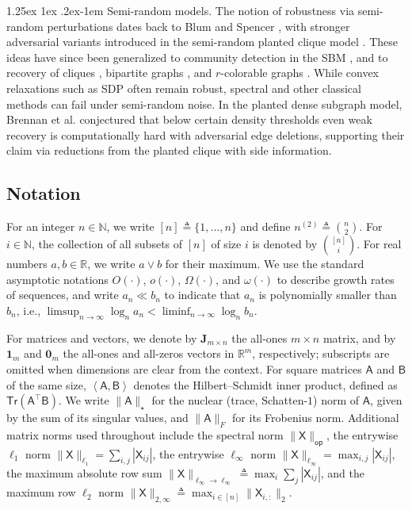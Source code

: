 \documentclass[12pt]{article}
\makeatletter
\newcommand{\R}{\mathbb{R}}
\newcommand{\N}{\mathbb{N}}
\newcommand{\innerP}[1]{\left\langle#1\right\rangle}
\newcommand{\s}[1]{\mathsf{#1}}
\renewcommand{\paragraph}{%
  \@startsection{paragraph}{4}%
  {\z@}{1.25ex \@plus 1ex \@minus .2ex}{-1em}%
  {\normalfont\normalsize\bfseries}%
}
\makeatother
\begin{document}
\paragraph{Semi-random models.} The notion of robustness via semi-random perturbations dates back to Blum and Spencer \cite{blum1995coloring}, with stronger adversarial variants introduced in the semi-random planted clique model \cite{feige2000finding,feige2001heuristics}. These ideas have since been generalized to community detection in the SBM \cite{charikar2017learning,moitra2016robustCD,banks2021local,bhaskara2024robustness}, and to recovery of cliques \cite{steinhardt2017does,mckenzie2020new,buhai2023algorithms,blasiok2024semirandom,guruswami2025semirandom}, bipartite graphs \cite{Kumar22}, and $r$-colorable graphs \cite{louis2025robust}. While convex relaxations such as SDP often remain robust, spectral and other classical methods can fail under semi-random noise. In the planted dense subgraph model, Brennan et al. \cite{brennan20a} conjectured that below certain density thresholds even weak recovery is computationally hard with adversarial edge deletions, supporting their claim via reductions from the planted clique with side information.

\subsection{Notation}

For an integer $n\in\N$, we write $[n]\triangleq\{1,\dots,n\}$ and define $n^{(2)}\triangleq\binom{n}{2}$. For $i\in\N$, the collection of all subsets of $[n]$ of size $i$ is denoted by $\binom{[n]}{i}$. For real numbers $a,b\in\R$, we write $a\vee b$ for their maximum. We use the standard asymptotic notations $O(\cdot)$, $o(\cdot)$, $\Omega(\cdot)$, and $\omega(\cdot)$ to describe growth rates of sequences, and write $a_n\ll b_n$ to indicate that $a_n$ is polynomially smaller than $b_n$, i.e., $\limsup_{n\to\infty}\log_n a_n < \liminf_{n\to\infty}\log_n b_n$.

For matrices and vectors, we denote by $\mathbf{J}_{m\times n}$ the all-ones $m\times n$ matrix, and by $\mathbf{1}_m$ and $\mathbf{0}_m$ the all-ones and all-zeros vectors in $\R^m$, respectively; subscripts are omitted when dimensions are clear from the context. For square matrices $\s{A}$ and $\s{B}$ of the same size, $\innerP{\s{A},\s{B}}$ denotes the Hilbert--Schmidt inner product, defined as $\s{Tr}(\s{A}^\top\s{B})$. We write $\|\s{A}\|_\star$ for the nuclear (trace, Schatten-$1$) norm of $\s{A}$, given by the sum of its singular values, and $\|\s{A}\|_F$ for its Frobenius norm. Additional matrix norms used throughout include the spectral norm $\|\s{X}\|_{\s{op}}$, the entrywise $\ell_1$ norm $\|\s{X}\|_{\ell_1}=\sum_{i,j}|\s{X}_{ij}|$, the entrywise $\ell_\infty$ norm $\|\s{X}\|_{\ell_\infty}=\max_{i,j}|\s{X}_{ij}|$, the maximum absolute row sum $\|\s{X}\|_{\ell_\infty\to\ell_\infty}\triangleq\max_i\sum_j|\s{X}_{ij}|$, and the maximum row $\ell_2$ norm $\|\s{X}\|_{2,\infty}\triangleq\max_{i\in[n]}\|\s{X}_{i,:}\|_2$.
\end{document}
